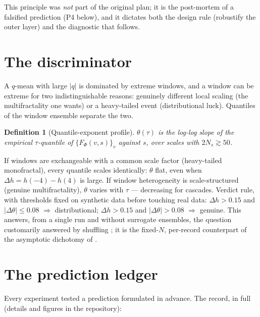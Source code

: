\documentclass[10pt, letterpaper]{paper}
\newtheorem{definition}[theorem]{Definition}
\theoremstyle{remark}
\newcommand{\Phifun}{\Phi}
\begin{document}
This principle was \emph{not} part of the original plan; it is the
post-mortem of a falsified prediction (P4 below), and it dictates
both the design rule (robustify the outer layer) and the diagnostic
that follows.

\section{The discriminator}

A $q$-mean with large $|q|$ is dominated by extreme windows, and a
window can be extreme for two indistinguishable reasons: genuinely
different local scaling (the multifractality one wants) or a
heavy-tailed event (distributional luck). Quantiles of the window
ensemble separate the two.

\begin{definition}[Quantile-exponent profile]\label{def:theta}
$\theta(\tau)$ is the log-log slope of the empirical
$\tau$-quantile of $\{F_\Phifun(v,s)\}_v$ against $s$, over scales
with $2N_s\gtrsim50$.
\end{definition}

If windows are exchangeable with a common scale factor (heavy-tailed
monofractal), every quantile scales identically: $\theta$ flat, even
when $\Delta h=h(-4)-h(4)$ is large. If window heterogeneity is
scale-structured (genuine multifractality), $\theta$ varies with
$\tau$ --- decreasing for cascades. Verdict rule, with thresholds
fixed on synthetic data before touching real data:
$\Delta h>0.15$ and $|\Delta\theta|\le0.08$ $\Rightarrow$
distributional; $\Delta h>0.15$ and $|\Delta\theta|>0.08$
$\Rightarrow$ genuine. This answers, from a single run and without
surrogate ensembles, the question customarily answered by shuffling
\citep{kantelhardt2002,movahed2006}; it is the fixed-$N$,
per-record counterpart of the asymptotic dichotomy of
\citet{kwapien2023}.

\section{The prediction ledger}

Every experiment tested a prediction formulated in advance. The
record, in full (details and figures in the repository):
\end{document}
